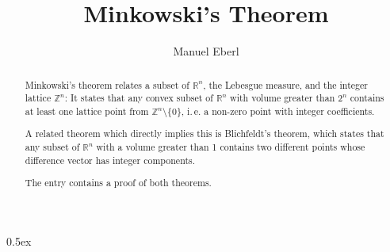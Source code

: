 \documentclass[11pt,a4paper]{article}
\begin{document}
\title{Minkowski's Theorem}
\author{Manuel Eberl}
\maketitle

\begin{abstract}
	Minkowski's theorem relates a subset of $\mathbb{R}^n$, the Lebesgue measure, and the integer lattice $\mathbb{Z}^n$: It states that any convex subset of $\mathbb{R}^n$ with volume greater than $2^n$ contains at least one lattice point from $\mathbb{Z}^n\setminus\{0\}$, i.\,e. a non-zero point with integer coefficients.

	A related theorem which directly implies this is Blichfeldt's theorem, which states that any subset of $\mathbb{R}^n$ with a volume greater than 1 contains two different points whose difference vector has integer components.

The entry contains a proof of both theorems.
\end{abstract}
\nocite{dummit}

\tableofcontents
\newpage
\parindent 0pt\parskip 0.5ex





\end{document}
